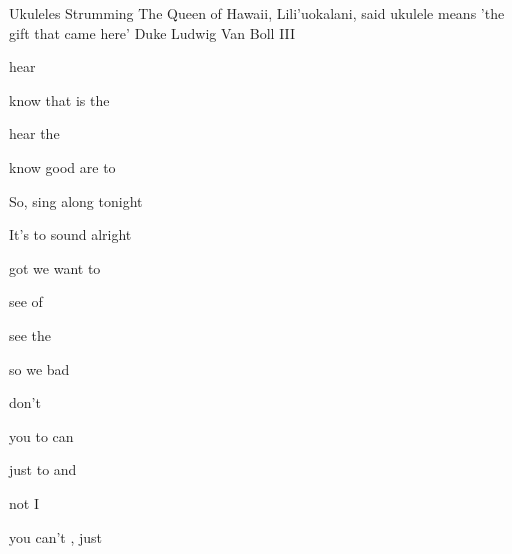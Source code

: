 \begin{SBSong}{Ukuleles Strumming}
  {The Queen of Hawaii, Lili'uokalani, said ukulele means 'the gift that came here'}
  {Duke Ludwig Van Boll III}
  \begin{SBVerse}
     hear  
    
     know that  is  the  
    
     hear the   
    
     know good  are  to  
  \end{SBVerse}
  \begin{SBChorus}
    So,  sing along tonight
    
    It's  to sound alright

     got  we want to 
  \end{SBChorus}
  \begin{SBVerse}
     see  of  

     see the   
    
     so   we  bad
    
     don't   
  \end{SBVerse}
  \begin{SBVerse}
     you  to  can 
    
     just  to  and 
    
     not  I  
    
     you can't ,  just 
  \end{SBVerse}
\end{SBSong}


